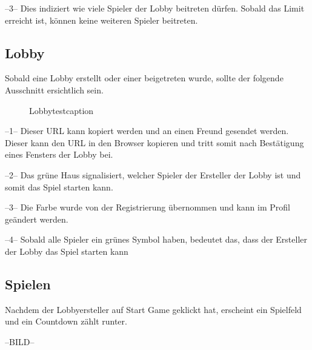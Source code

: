 \documentclass[11pt,ngerman]{article}
\begin{document}
    --3-- Dies indiziert wie viele Spieler der Lobby beitreten dürfen. Sobald das Limit erreicht ist, können keine weiteren Spieler beitreten.
    
	\subsection{Lobby}
	
	Sobald eine Lobby erstellt oder einer beigetreten wurde, sollte der folgende Ausschnitt ersichtlich sein.
    \begin{figure}[H]
    	\centering
    	\caption{Lobbytestcaption}
    	\label{fig:Lobbytest_caption}
    \end{figure}
  
    
    --1-- Dieser URL kann kopiert werden und an einen Freund gesendet werden. Dieser kann den URL in den Browser kopieren und tritt somit nach Bestätigung eines Fensters der Lobby bei.
    
    --2-- Das grüne Haus signalisiert, welcher Spieler der Ersteller der Lobby ist und somit das Spiel starten kann.
    
    --3-- Die Farbe wurde von der Registrierung übernommen und kann im Profil geändert werden.
    
    --4-- Sobald alle Spieler ein grünes Symbol haben, bedeutet das, dass der Ersteller der Lobby das Spiel starten kann
    
    \subsection{Spielen}
    
    Nachdem der Lobbyersteller auf Start Game geklickt hat, erscheint ein Spielfeld und ein Countdown zählt runter.
    
    --BILD--
    
    
\end{document}
